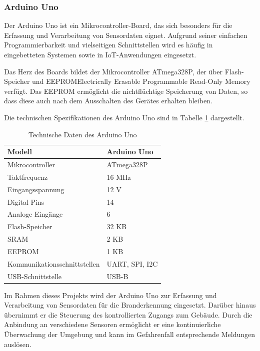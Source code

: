 \documentclass[12pt, letterpaper]{article}
\begin{document}
  \subsubsection{Arduino Uno}
    \par Der Arduino Uno ist ein Mikrocontroller-Board, das sich besonders für die Erfassung und Verarbeitung von Sensordaten eignet. Aufgrund seiner einfachen Programmierbarkeit und vielseitigen Schnittstellen wird es häufig in eingebetteten Systemen sowie in IoT-Anwendungen eingesetzt.
    \par Das Herz des Boards bildet der Mikrocontroller ATmega328P, der über Flash-Speicher und EEPROM{Electrically Erasable Programmable Read-Only Memory} verfügt. Das EEPROM ermöglicht die nichtflüchtige Speicherung von Daten, so dass diese auch nach dem Ausschalten des Gerätes erhalten bleiben.
    \par Die technischen Spezifikationen des Arduino Uno sind in Tabelle \ref{tab:arduinounotd} dargestellt.
    \begin{table}[h]
      \centering
      \begin{tabular}{|l|l|}
          \hline
          Modell                         & Arduino Uno                \\ \hline
          Mikrocontroller                & ATmega328P                      \\ \hline
          Taktfrequenz                   & 16 MHz                          \\ \hline
          Eingangsspannung               & 12 V                          \\ \hline
          Digital Pins                   & 14           \\ \hline
          Analoge Eingänge               & 6                               \\ \hline
          Flash-Speicher                 & 32 KB                           \\ \hline
          SRAM                           & 2 KB                            \\ \hline
          EEPROM                         & 1 KB                            \\ \hline
          Kommunikationsschnittstellen   & UART, SPI, I2C                  \\ \hline
          USB-Schnittstelle              & USB-B  \\ \hline
      \end{tabular}
      \caption{Technische Daten des Arduino Uno}
      \label{tab:arduinounotd}
  \end{table}
  \par Im Rahmen dieses Projekts wird der Arduino Uno zur Erfassung und Verarbeitung von Sensordaten für die Branderkennung eingesetzt. Darüber hinaus übernimmt er die Steuerung des kontrollierten Zugangs zum Gebäude. Durch die Anbindung an verschiedene Sensoren ermöglicht er eine kontinuierliche Überwachung der Umgebung und kann im Gefahrenfall entsprechende Meldungen auslösen.
\end{document}
